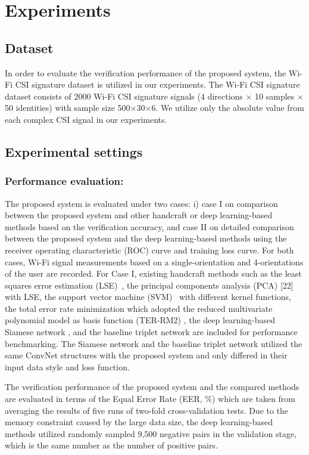 \documentclass[sigconf]{acmart}
\begin{document}
\section{Experiments}

\subsection{Dataset}
 In order to evaluate the verification performance of the proposed system, the Wi-Fi CSI signature dataset \cite{moon2017air} is utilized in our experiments. The Wi-Fi CSI signature dataset consists of 2000 Wi-Fi CSI signature signals (4 directions $\times$ 10 samples $\times$ 50 identities) with sample size 500$\times$30$\times$6. We utilize only the absolute value from each complex CSI signal in our experiments.

\subsection{Experimental settings}

\subsubsection{Performance evaluation:}
The proposed system is evaluated under two cases: i) case I on comparison between the proposed system and other handcraft or deep learning-based methods based on the verification accuracy, and case II on detailed comparison between the proposed system and the deep learning-based methods using the receiver operating characteristic (ROC) curve and training loss curve. For both cases, Wi-Fi signal measurements based on a single-orientation and 4-orientations of the user are recorded. For Case I, existing handcraft methods such as the least squares error estimation (LSE)~\cite{duda2012pattern}, the principal components analysis (PCA) [22] with LSE, the support vector machine (SVM)~\cite{vapnik2013nature} with different kernel functions, the total error rate minimization which adopted the reduced multivariate polynomial model as basis function (TER-RM2) \cite{toh2003fingerprint,toh2008between}, the deep learning-based Siamese network \cite{koch2015siamese}, and the baseline triplet network \cite{hoffer2015deep} are included for performance benchmarking. The Siamese network and the baseline triplet network utilized the same ConvNet structures with the proposed system and only differed in their input data style and loss function.

The verification performance of the proposed system and the compared methods are evaluated in terms of the Equal Error Rate (EER, \%) which are taken from averaging the results of five runs of two-fold cross-validation tests. Due to the memory constraint caused by the large data size, the deep learning-based methods utilized randomly sampled 9,500 negative pairs in the validation stage, which is the same number as the number of positive pairs.
\end{document}
